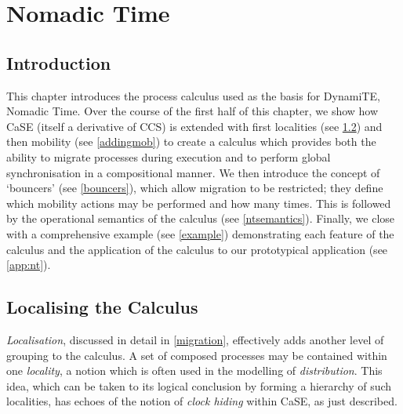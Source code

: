 
\chapter{Nomadic Time}
\label{nt}

\section{Introduction}

This chapter introduces the process calculus used as the basis for
DynamiTE, Nomadic Time.  Over the course of the first half of this
chapter, we show how CaSE (itself a derivative of CCS) is extended
with first localities (see \ref{localising}) and then mobility (see
\ref{addingmob}) to create a calculus which provides both the ability
to migrate processes during execution and to perform global
synchronisation in a compositional manner.  We then introduce the
concept of `bouncers' (see \ref{bouncers}), which allow migration to
be restricted; they define which mobility actions may be performed and
how many times.  This is followed by the operational semantics of the
calculus (see \ref{ntsemantics}).  Finally, we close with a
comprehensive example (see \ref{example}) demonstrating each feature
of the calculus and the application of the calculus to our
prototypical application (see \ref{app:nt}).

\section{Localising the Calculus}
\label{localising}

\emph{Localisation}, discussed in detail in \ref{migration}, effectively
adds another level of grouping to the calculus.  A set of composed
processes may be contained within one \emph{locality}, a notion which is
often used in the modelling of \emph{distribution}.  This idea, which
can be taken to its logical conclusion by forming a hierarchy of such
localities, has echoes of the notion of \emph{clock hiding} within CaSE,
as just described.

